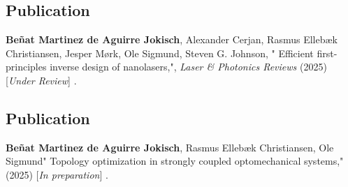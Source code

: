 \vspace*{0.4\textheight}
\begin{center}
  \begin{minipage}{0.9\linewidth}
    \section*{Publication \cite{ownpub4}}
    \textbf{Beñat Martinez de Aguirre Jokisch}, Alexander Cerjan, Rasmus Ellebæk Christiansen, Jesper Mørk, Ole Sigmund, Steven G. Johnson, "
    Efficient first-principles inverse design of nanolasers,", \textit{Laser \& Photonics Reviews} (2025) [\textit{Under Review}] .
  \end{minipage}
\end{center}
\newpage


\vspace*{0.4\textheight}
\begin{center}
  \begin{minipage}{0.9\linewidth}
    \section*{Publication \cite{ownpub5}}
    \textbf{Beñat Martinez de Aguirre Jokisch}, Rasmus Ellebæk Christiansen, Ole Sigmund"
    Topology optimization in strongly coupled optomechanical systems," (2025) [\textit{In preparation}] .
  \end{minipage}
\end{center}
\newpage


%

